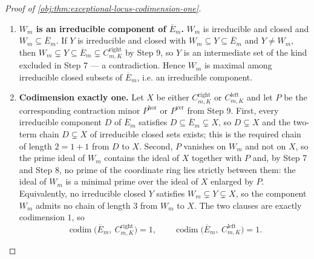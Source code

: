\documentclass[11pt]{article}
\begin{document}
\begin{proof}[Proof of \cref{obj:thm:exceptional-locus-codimension-one}]
\begin{enumerate}

\item \textbf{\(W_m\) is an irreducible component of \(\overline E_m\).}  \(W_m\) is irreducible and closed and \(W_m\subseteq\overline E_m\).  If \(Y\) is irreducible and closed with \(W_m\subseteq Y\subseteq\overline E_m\) and \(Y\ne W_m\), then \(W_m\subsetneq Y\subseteq\overline E_m\subsetneq C^{\mathrm{right}}_{m,K}\) by Step 9, so \(Y\) is an intermediate set of the kind excluded in Step 7 — a contradiction.  Hence \(W_m\) is maximal among irreducible closed subsets of \(\overline E_m\), i.e. an irreducible component.

\item \textbf{Codimension exactly one.}  Let \(X\) be either \(C^{\mathrm{right}}_{m,K}\) or \(C^{\mathrm{left}}_{m,K}\) and let \(P\) be the corresponding contraction minor \(P^{\mathrm{hor}}\) or \(P^{\mathrm{ver}}\) from Step 9.  First, every irreducible component \(D\) of \(\overline E_m\) satisfies \(D\subseteq\overline E_m\subsetneq X\), so \(D\subsetneq X\) and the two-term chain \(D\subsetneq X\) of irreducible closed sets exists; this is the required chain of length \(2=1+1\) from \(D\) to \(X\).  Second, \(P\) vanishes on \(W_m\) and not on \(X\), so the prime ideal of \(W_m\) contains the ideal of \(X\) together with \(P\) and, by Step 7 and Step 8, no prime of the coordinate ring lies strictly between them: the ideal of \(W_m\) is a minimal prime over the ideal of \(X\) enlarged by \(P\).  Equivalently, no irreducible closed \(Y\) satisfies \(W_m\subsetneq Y\subsetneq X\), so the component \(W_m\) admits no chain of length \(3\) from \(W_m\) to \(X\).  The two clauses are exactly codimension \(1\), so
\[
\operatorname{codim}\bigl(\overline E_m,\ C^{\mathrm{right}}_{m,K}\bigr)=1,
\qquad
\operatorname{codim}\bigl(\overline E_m,\ C^{\mathrm{left}}_{m,K}\bigr)=1 .
\]


\end{enumerate}
\end{proof}
\end{document}
